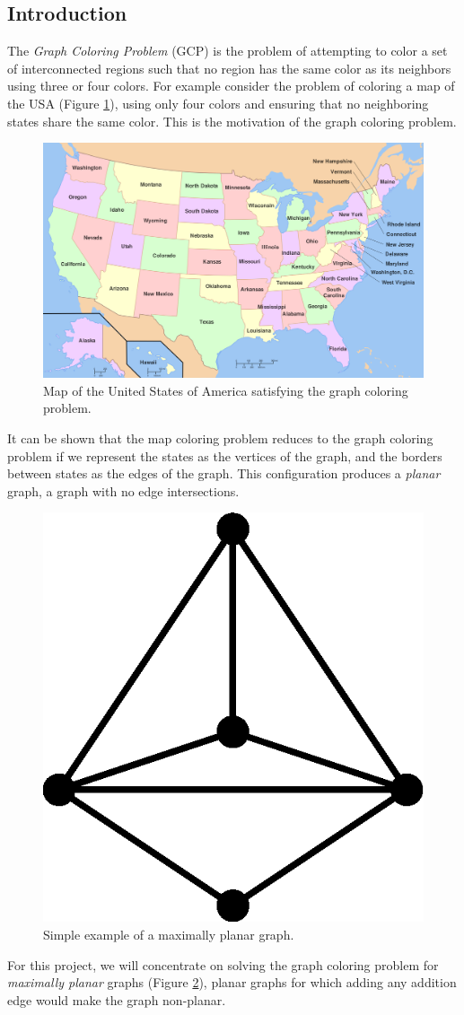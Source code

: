 \documentclass{article}
\begin{document}
\begin{multicols}{2}
\section{Introduction}
The \textit{Graph Coloring Problem} (GCP) is the problem of attempting to color a set of interconnected regions such that no region has the same color as its neighbors using three or four colors. For example consider the problem of coloring a map of the USA (Figure \ref{usa}), using only four colors and ensuring that no neighboring states share the same color. This is the motivation of the graph coloring problem. 
\begin{figure}[H]
	\centering
	\includegraphics[width=\linewidth]{images/usa}
	\caption{Map of the United States of America satisfying the graph coloring problem.}
	\label{usa}
\end{figure}
It can be shown that the map coloring problem reduces to the graph coloring problem if we represent the states as the vertices of the graph, and the borders between states as the edges of the graph\cite{ai}. This configuration produces a \textit{planar} graph, a graph with no edge intersections. 
\begin{figure}[H]
	\centering
	\includegraphics[width=0.4\linewidth]{images/simple_graph}
	\caption{Simple example of a maximally planar graph.}
	\label{simple}
\end{figure}
For this project, we will concentrate on solving the graph coloring problem for \textit{maximally planar} graphs (Figure \ref{simple}), planar graphs for which adding any addition edge would make the graph non-planar.


\end{multicols}
\end{document}
